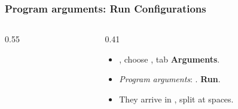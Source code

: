 \documentclass[aspectratio=169,10pt,compress]{beamer}
\begin{document}
\begin{frame}[t,fragile] \frametitle{Program arguments: Run Configurations}
  \begin{columns}[T]
    \begin{column}{0.55\textwidth}
    \end{column}
    \begin{column}{0.41\textwidth}
      \begin{itemize}\small
        \item {}, choose , tab \textbf{Arguments}.
        \item \emph{Program arguments}: . \textbf{Run}.
        \item They arrive in , split at spaces.
      \end{itemize}
    \end{column}
  \end{columns}
\end{frame}

\end{document}
